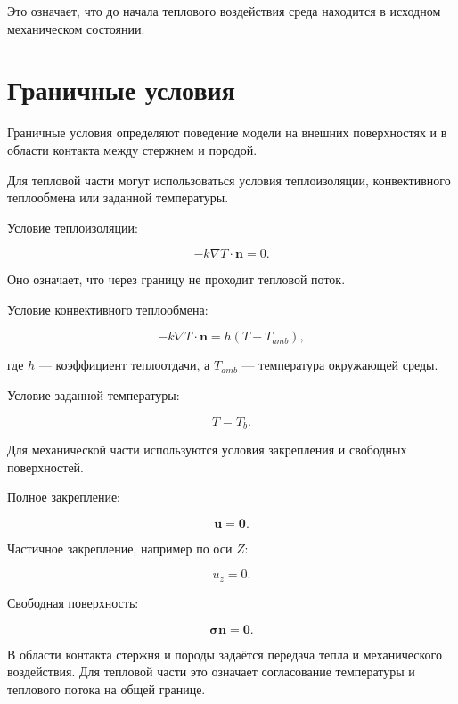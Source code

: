 Это означает, что до начала теплового воздействия среда находится в исходном механическом состоянии.

\section{Граничные условия}

Граничные условия определяют поведение модели на внешних поверхностях и в области контакта между стержнем и породой.

Для тепловой части могут использоваться условия теплоизоляции, конвективного теплообмена или заданной температуры.

Условие теплоизоляции:

\begin{equation}
-k\nabla T\cdot\mathbf{n}=0.
\end{equation}

Оно означает, что через границу не проходит тепловой поток.

Условие конвективного теплообмена:

\begin{equation}
-k\nabla T\cdot\mathbf{n}=h(T-T_{amb}),
\end{equation}

где $h$ --- коэффициент теплоотдачи, а $T_{amb}$ --- температура окружающей среды.

Условие заданной температуры:

\begin{equation}
T=T_b.
\end{equation}

Для механической части используются условия закрепления и свободных поверхностей.

Полное закрепление:

\begin{equation}
\mathbf{u}=\mathbf{0}.
\end{equation}

Частичное закрепление, например по оси $Z$:

\begin{equation}
u_z=0.
\end{equation}

Свободная поверхность:

\begin{equation}
\boldsymbol{\sigma}\mathbf{n}=\mathbf{0}.
\end{equation}

В области контакта стержня и породы задаётся передача тепла и механического воздействия. Для тепловой части это означает согласование температуры и теплового потока на общей границе.

